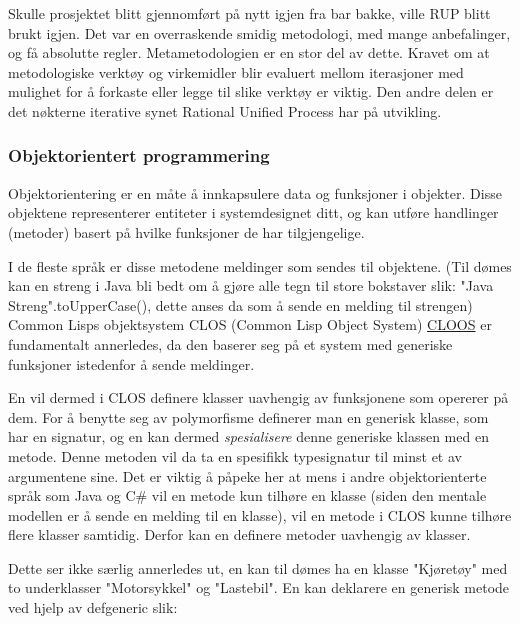 \documentclass[norsk, 11pt, a4paper]{article}
\begin{document}
Skulle prosjektet blitt gjennomført på nytt igjen fra bar bakke, ville RUP blitt brukt igjen. Det var en overraskende smidig metodologi, med mange anbefalinger, og få absolutte regler. Metametodologien er en stor del av dette. Kravet om at metodologiske verktøy og virkemidler blir evaluert mellom iterasjoner med mulighet for å forkaste eller legge til slike verktøy er viktig. Den andre delen er det nøkterne iterative synet Rational Unified Process har på utvikling. 



\subsubsection{Objektorientert programmering}



Objektorientering er en måte å innkapsulere data og funksjoner i objekter. Disse objektene representerer entiteter i systemdesignet ditt, og kan utføre handlinger (metoder) basert på hvilke funksjoner de har tilgjengelige. 



I de fleste språk er disse metodene meldinger som sendes til objektene. (Til dømes kan en streng i Java bli bedt om å gjøre alle tegn til store bokstaver slik: "Java Streng".toUpperCase(), dette anses da som å sende en melding til strengen) Common Lisps objektsystem CLOS (Common Lisp Object System) \href{http://www.dreamsongs.com/NewFiles/ECOOP.pdf}{CLOOS} er fundamentalt annerledes, da den baserer seg på et system med generiske funksjoner istedenfor å sende meldinger.



En vil dermed i CLOS definere klasser uavhengig av funksjonene som opererer på dem. For å benytte seg av polymorfisme definerer man en generisk klasse, som har en signatur, og en kan dermed \emph{spesialisere} denne generiske klassen med en metode. Denne metoden vil da ta en spesifikk typesignatur til minst et av argumentene sine. Det er viktig å påpeke her at mens i andre objektorienterte språk som Java og C\# vil en metode kun tilhøre en klasse (siden den mentale modellen er å sende en melding til en klasse), vil en metode i CLOS kunne tilhøre flere klasser samtidig. Derfor kan en definere metoder uavhengig av klasser.



Dette ser ikke særlig annerledes ut, en kan til dømes ha en klasse "Kjøretøy" med to underklasser "Motorsykkel" og "Lastebil". En kan deklarere en generisk metode ved hjelp av defgeneric slik:
\end{document}
